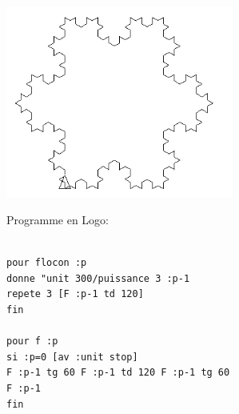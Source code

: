 \begin{center}
\begin{minipage}{7.5cm}
\end{minipage}
\begin{minipage}{7.5cm}
 \includegraphics[width=7.5cm]{images/linden-flocon4.png}
\end{minipage}
\end{center}
\noindent Programme en Logo:
\begin{verbatim}
 
pour flocon :p
donne "unit 300/puissance 3 :p-1
repete 3 [F :p-1 td 120]  
fin

pour f :p
si :p=0 [av :unit stop]
F :p-1 tg 60 F :p-1 td 120 F :p-1 tg 60
F :p-1 
fin

\end{verbatim}
